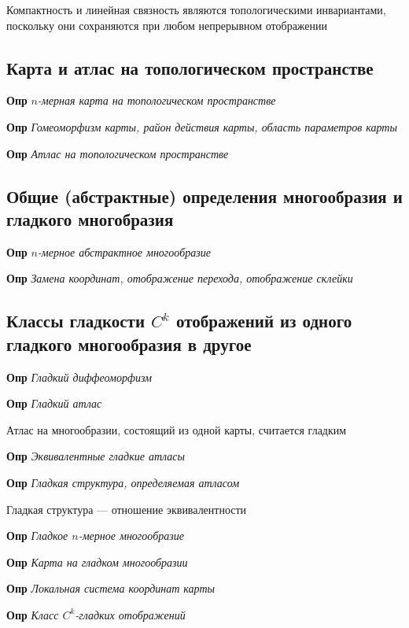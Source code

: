 \documentclass[a4paper, 14pt]{article}
\begin{document}
    Компактность и линейная связность являются топологическими инвариантами, поскольку они сохраняются при любом
    непрерывном отображении
    
    \subsection{Карта и атлас на топологическом пространстве}
    
    \textbf{Опр} \textit{$n$-мерная карта на топологическом пространстве}
    
    \textbf{Опр} \textit{Гомеоморфизм карты, район действия карты, область параметров карты}
    
    \textbf{Опр} \textit{Атлас на топологическом пространстве}
    
    \subsection{Общие (абстрактные) определения многообразия и гладкого многобразия}
    
    \textbf{Опр} \textit{$n$-мерное абстрактное многообразие}
    
    \textbf{Опр} \textit{Замена координат, отображение перехода, отображение склейки}
    
    \subsection{Классы гладкости $C^k$ отображений из одного гладкого многообразия в другое}
    
    \textbf{Опр} \textit{Гладкий диффеоморфизм}
    
    \textbf{Опр} \textit{Гладкий атлас}
    
    Атлас на многообразии, состоящий из одной карты, считается гладким
    
    \textbf{Опр} \textit{Эквивалентные гладкие атласы}
    
    \textbf{Опр} \textit{Гладкая структура, определяемая атласом}
    
    Гладкая структура --- отношение эквивалентности
    
    \textbf{Опр} \textit{Гладкое $n$-мерное многообразие}
    
    \textbf{Опр} \textit{Карта на гладком многообразии}
    
    \textbf{Опр} \textit{Локальная система координат карты}
    
    \textbf{Опр} \textit{Класс $C^k$-гладких отображений}
    
\end{document}
